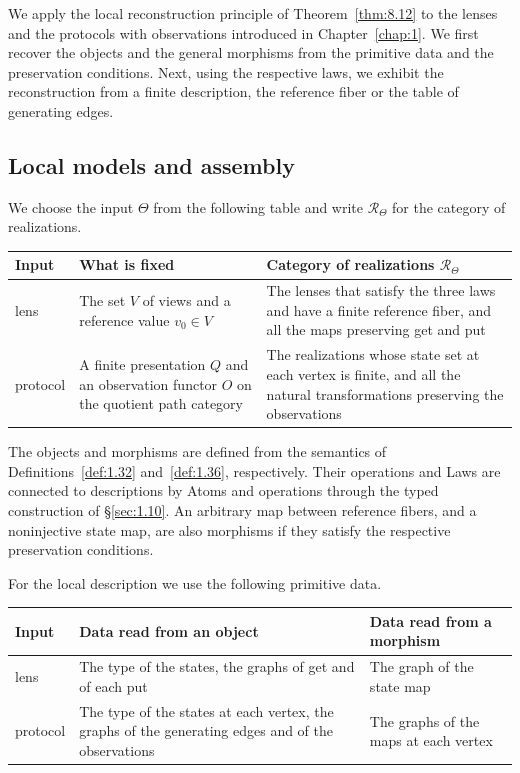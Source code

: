 We apply the local reconstruction principle of Theorem~\ref{thm:8.12} to the lenses and the
protocols with observations introduced in Chapter~\ref{chap:1}.
We first recover the objects and the general morphisms from the primitive data and the
preservation conditions.
Next, using the respective laws, we exhibit the reconstruction from a finite description, the
reference fiber or the table of generating edges.

\subsection*{Local models and assembly}

\begin{construction}\label{cons:8.22}

We choose the input $\Theta$ from the following table and write $\mathcal{R}_\Theta$ for the
category of realizations.

\begin{xltabular}{\linewidth}{@{}LLL@{}}
\toprule
Input & What is fixed & Category of realizations $\mathcal{R}_\Theta$ \\
\midrule
\endhead
lens & The set $V$ of views and a reference value $v_0\in V$ & The lenses that satisfy the three laws and have a finite reference fiber, and all the maps preserving get and put \\
\addlinespace[3pt]
protocol & A finite presentation $Q$ and an observation functor $O$ on the quotient path category & The realizations whose state set at each vertex is finite, and all the natural transformations preserving the observations \\
\bottomrule
\end{xltabular}

The objects and morphisms are defined from the semantics of Definitions~\ref{def:1.32}
and~\ref{def:1.36}, respectively.
Their operations and Laws are connected to descriptions by Atoms and operations through the
typed construction of \S\ref{sec:1.10}.
An arbitrary map between reference fibers, and a noninjective state map, are also morphisms if
they satisfy the respective preservation conditions.

For the local description we use the following primitive data.

\begin{xltabular}{\linewidth}{@{}LLL@{}}
\toprule
Input & Data read from an object & Data read from a morphism \\
\midrule
\endhead
lens & The type of the states, the graphs of get and of each put & The graph of the state map \\
\addlinespace[3pt]
protocol & The type of the states at each vertex, the graphs of the generating edges and of the observations & The graphs of the maps at each vertex \\
\bottomrule
\end{xltabular}


\end{construction}
